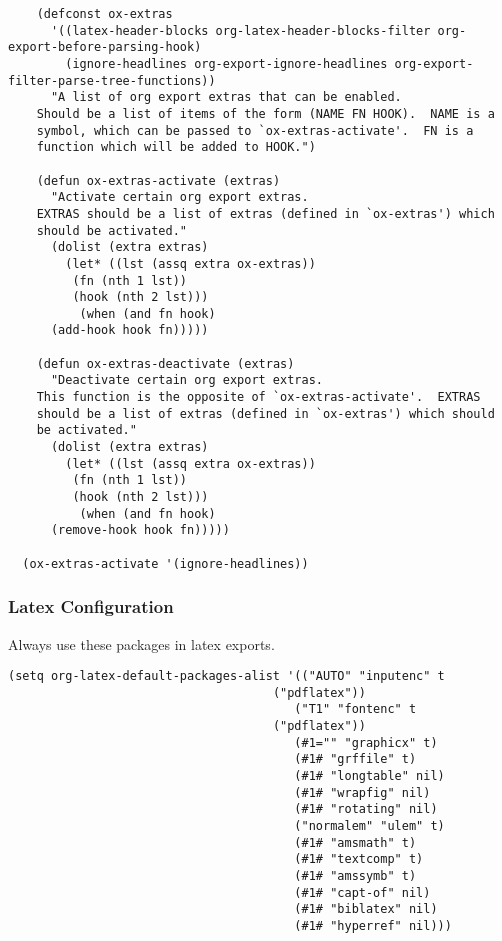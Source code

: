 \documentclass[11pt]{article}
\begin{document}
\begin{verbatim}
    (defconst ox-extras
      '((latex-header-blocks org-latex-header-blocks-filter org-export-before-parsing-hook)
        (ignore-headlines org-export-ignore-headlines org-export-filter-parse-tree-functions))
      "A list of org export extras that can be enabled.
    Should be a list of items of the form (NAME FN HOOK).  NAME is a
    symbol, which can be passed to `ox-extras-activate'.  FN is a
    function which will be added to HOOK.")

    (defun ox-extras-activate (extras)
      "Activate certain org export extras.
    EXTRAS should be a list of extras (defined in `ox-extras') which
    should be activated."
      (dolist (extra extras)
        (let* ((lst (assq extra ox-extras))
         (fn (nth 1 lst))
         (hook (nth 2 lst)))
          (when (and fn hook)
      (add-hook hook fn)))))

    (defun ox-extras-deactivate (extras)
      "Deactivate certain org export extras.
    This function is the opposite of `ox-extras-activate'.  EXTRAS
    should be a list of extras (defined in `ox-extras') which should
    be activated."
      (dolist (extra extras)
        (let* ((lst (assq extra ox-extras))
         (fn (nth 1 lst))
         (hook (nth 2 lst)))
          (when (and fn hook)
      (remove-hook hook fn)))))

  (ox-extras-activate '(ignore-headlines))

\end{verbatim}

\subsubsection{Latex Configuration}
\label{sec:org0569a01}
Always use these packages in latex exports.
\begin{verbatim}
(setq org-latex-default-packages-alist '(("AUTO" "inputenc" t
                                     ("pdflatex"))
                                        ("T1" "fontenc" t
                                     ("pdflatex"))
                                        (#1="" "graphicx" t)
                                        (#1# "grffile" t)
                                        (#1# "longtable" nil)
                                        (#1# "wrapfig" nil)
                                        (#1# "rotating" nil)
                                        ("normalem" "ulem" t)
                                        (#1# "amsmath" t)
                                        (#1# "textcomp" t)
                                        (#1# "amssymb" t)
                                        (#1# "capt-of" nil)
                                        (#1# "biblatex" nil)
                                        (#1# "hyperref" nil)))

\end{verbatim}
\end{document}

